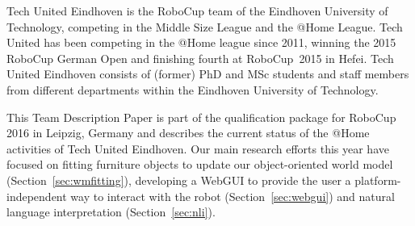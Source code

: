 Tech United Eindhoven is the RoboCup team of the Eindhoven University of Technology, competing in the Middle Size League and the @Home League. Tech United has been competing in the @Home league since 2011, winning the 2015 RoboCup German Open and finishing fourth at RoboCup~2015 in Hefei. 
Tech United Eindhoven consists of (former) PhD and MSc students and staff members from different departments within the Eindhoven University of Technology.

This Team Description Paper is part of the qualification package for RoboCup 2016 in Leipzig, Germany and describes the current status of the @Home activities of Tech United Eindhoven.
Our main research efforts this year have focused on fitting furniture objects to update our object-oriented world model (Section~\ref{sec:wmfitting}), developing a WebGUI to provide the user a platform-independent way to interact with the robot (Section~\ref{sec:webgui}) and natural language interpretation (Section~\ref{sec:nli}).   
